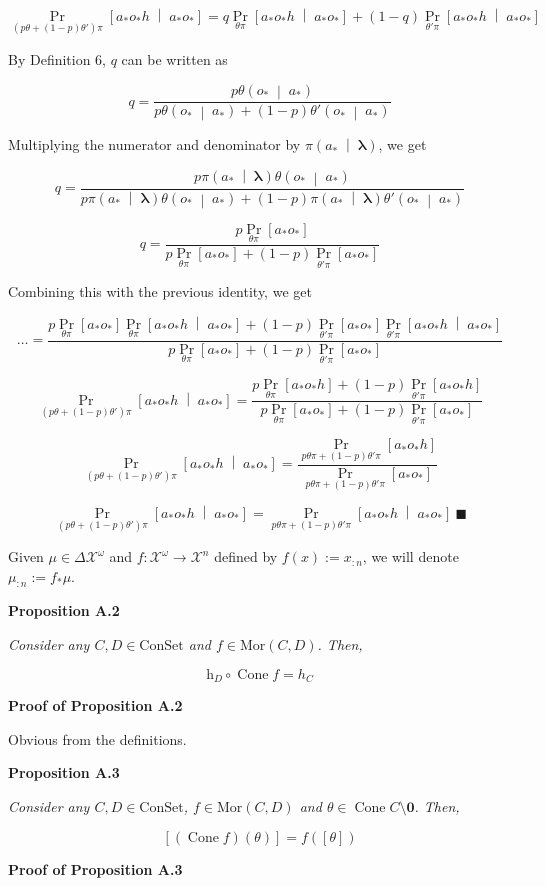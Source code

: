 \documentclass[a4paper]{article}
\newcommand{\Co}[1]{}
\newcommand{\AP}[1]{\left(#1\right)}
\newcommand{\AB}[1]{\left[#1\right]}
\newcommand{\APM}[2]{\left(#1\;\middle\vert\;#2\right)}
\newcommand{\ABM}[2]{\left[#1\;\middle\vert\;#2\right]}
\newcommand{\Pa}[2]{\underset{#1}{\operatorname{Pr}}\AB{#2}}
\newcommand{\CP}[3]{\underset{#1}{\operatorname{Pr}}\ABM{#2}{#3}}
\newcommand{\Mor}{\mathrm{Mor}}
\newcommand{\Estr}{\boldsymbol{\lambda}}
\newcommand{\Con}{{\boldsymbol{\mathrm{ConSet}}}}
\DeclareMathOperator{\Cone}{Cone}
\newcommand{\Ht}{\mathrm{h}}
\newcommand{\X}{\mathcal{X}}
\begin{document}
$$\CP{\AP{p\theta+(1-p)\theta'}\pi}{a_*o_*h}{a_*o_*}=q\CP{\theta\pi}{a_*o_*h}{a_*o_*}+(1-q)\CP{\theta'\pi}{a_*o_*h}{a_*o_*}$$

By Definition 6, $q$ can be written as

$$q=\frac{p\theta\APM{o_*}{a_*}}{p\theta\APM{o_*}{a_*}+(1-p)\theta'\APM{o_*}{a_*}}$$

Multiplying the numerator and denominator by $\pi\APM{a_*}{\Estr}$, we get

$$q=\frac{p\pi\APM{a_*}{\Estr}\theta\APM{o_*}{a_*}}{p\pi\APM{a_*}{\Estr}\theta\APM{o_*}{a_*}+(1-p)\pi\APM{a_*}{\Estr}\theta'\APM{o_*}{a_*}}$$

$$q=\frac{p\Pa{\theta\pi}{a_*o_*}}{p\Pa{\theta\pi}{a_*o_*}+(1-p)\Pa{\theta'\pi}{a_*o_*}}$$

Combining this with the previous identity, we get 

$$\ldots=\frac{p\Pa{\theta\pi}{a_*o_*}\CP{\theta\pi}{a_*o_*h}{a_*o_*}+(1-p)\Pa{\theta'\pi}{a_*o_*}\CP{\theta'\pi}{a_*o_*h}{a_*o_*}}{p\Pa{\theta\pi}{a_*o_*}+(1-p)\Pa{\theta'\pi}{a_*o_*}}$$

$$\CP{\AP{p\theta+(1-p)\theta'}\pi}{a_*o_*h}{a_*o_*}=\frac{p\Pa{\theta\pi}{a_*o_*h}+(1-p)\Pa{\theta'\pi}{a_*o_*h}}{p\Pa{\theta\pi}{a_*o_*}+(1-p)\Pa{\theta'\pi}{a_*o_*}}$$

$$\CP{\AP{p\theta+(1-p)\theta'}\pi}{a_*o_*h}{a_*o_*}=\frac{\Pa{p\theta\pi+(1-p)\theta'\pi}{a_*o_*h}}{\Pa{p\theta\pi+(1-p)\theta'\pi}{a_*o_*}}$$

$$\CP{\AP{p\theta+(1-p)\theta'}\pi}{a_*o_*h}{a_*o_*}=\CP{p\theta\pi+(1-p)\theta'\pi}{a_*o_*h}{a_*o_*}\ \blacksquare$$

Given $\mu\in\Delta\X^\omega$ and $f:\mathcal{X}^\omega\rightarrow\mathcal{X}^n$ defined by $f(x):=x_{:n}$, we will denote $\mu_{:n}:=f_*\mu$.

\textbf{Proposition A.2}\Co{b}

\textit{Consider any $C,D\in\Con$ and $f\in\Mor(C,D)$. Then,}\Co{i}

$$\Ht_D\circ \Cone f=h_C$$

\textbf{Proof of Proposition A.2}\Co{b}

Obvious from the definitions.

\textbf{Proposition A.3}\Co{b}

\textit{Consider any $C,D\in\Con$, $f\in\Mor(C,D)$ and $\theta\in\Cone C\setminus\boldsymbol{0}$. Then,}\Co{i}

$$\AB{\AP{\Cone f}(\theta)}=f\AP{\AB{\theta}}$$

\textbf{Proof of Proposition A.3}\Co{b}
\end{document}
